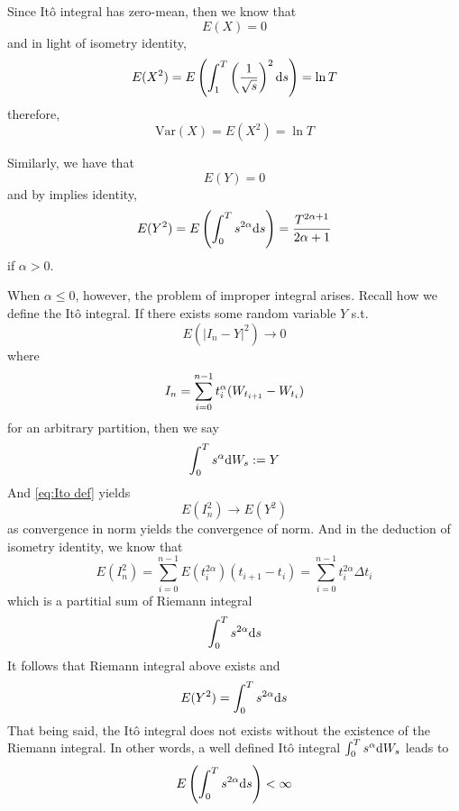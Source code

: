 \documentclass{homework}
\newcommand{\var}{\mathrm{Var}}
\begin{document}
    \problem
    \begin{subproblem}[(\arabic*).]
        \item
        Since It\^o integral has zero-mean, then
        we know that
        \[E(X)=0\]
        and in light of isometry identity,
        \[E(X^2)=E\left(\int_1^T\left(\frac{1}{\sqrt s}\right)^2
        \mathrm d s\right)=\ln T\]
        therefore,
        \[\var(X)=E(X^2)=\ln T\]

        \item
        Similarly, we have that
        \[E(Y)=0\]
        and by implies identity,
        \[E(Y^2)=E\left(\int_0^Ts^{2\alpha}\mathrm d s\right)
        =\frac{T^{2\alpha+1}}{2\alpha+1}\]
        if $\alpha>0$.

        When $\alpha\leq 0$, however,
        the problem of improper integral arises.
        Recall how we define the It\^o integral.
        If there exists some random variable $Y$ s.t.
        \begin{equation}
            \label{eq:Ito def}
            E(|I_n-Y|^2)\to 0
        \end{equation}
        where
        \[I_n=\sum_{i=0}^{n-1}t_i^\alpha(W_{t_{i+1}}-W_{t_i})\]
        for an arbitrary partition,
        then we say
        \[\int_0^Ts^\alpha\mathrm d W_s:=Y\]
        And \cref{eq:Ito def} yields
        \[E(I_n^2)\to E(Y^2)\]
        as convergence in norm yields the convergence of norm.
        And in the deduction of isometry identity, we know that
        \[E(I_n^2)=\sum_{i=0}^{n-1}E(t_i^{2\alpha})(t_{i+1}-t_i)
        =\sum_{i=0}^{n-1}t_i^{2\alpha}\Delta t_i\]
        which is a partitial sum of Riemann integral
        \begin{equation}
            \label{eq:Riemann int}
            \int_0^Ts^{2\alpha}\mathrm d s
        \end{equation}
        It follows that Riemann integral above exists
        and
        \[E(Y^2)=\int_0^Ts^{2\alpha}\mathrm d s\]
        That being said, the It\^o integral does not exists
        without the existence of the Riemann integral.
        In other words, a well defined It\^o integral
        $\int_0^Ts^\alpha\mathrm d W_s$
        leads to
        \[E\left(\int_0^Ts^{2\alpha}\mathrm d s\right)<\infty\]


\end{subproblem}
\end{document}
